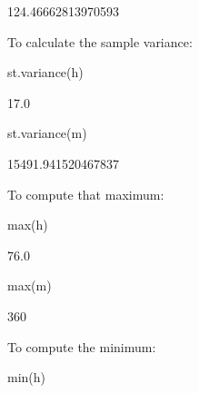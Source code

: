 \begin{raw}
124.46662813970593
\end{raw}





To calculate the sample variance:




\begin{pyin}
st.variance(h)
\end{pyin}





\begin{raw}
17.0
\end{raw}







\begin{pyin}
st.variance(m)
\end{pyin}





\begin{raw}
15491.941520467837
\end{raw}





To compute that maximum:




\begin{pyin}
max(h)
\end{pyin}





\begin{raw}
76.0
\end{raw}







\begin{pyin}
max(m)
\end{pyin}





\begin{raw}
360
\end{raw}





To compute the minimum:




\begin{pyin}
min(h)
\end{pyin}






